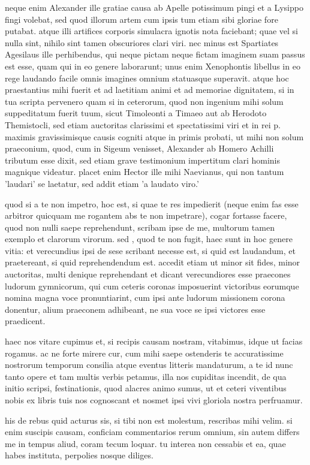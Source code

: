  neque enim Alexander ille gratiae causa ab Apelle potissimum pingi et a Lysippo fingi volebat, sed quod illorum artem cum ipsis tum etiam sibi gloriae fore putabat. atque illi artifices corporis simulacra ignotis nota faciebant; quae vel si nulla sint, nihilo sint tamen obscuriores clari viri. nec minus est Spartiates Agesilaus ille perhibendus, qui neque pictam neque fictam imaginem suam passus est esse, quam qui in eo genere laborarunt; unus enim Xenophontis libellus in eo rege laudando facile omnis imagines omnium statuasque superavit. atque hoc praestantius mihi fuerit et ad laetitiam animi et ad memoriae dignitatem, si in tua scripta pervenero quam si in ceterorum, quod non ingenium mihi solum suppeditatum fuerit tuum, sicut Timoleonti a Timaeo aut ab Herodoto Themistocli, sed etiam auctoritas clarissimi et spectatissimi viri et in rei p. maximis gravissimisque causis cogniti atque in primis probati, ut mihi non solum praeconium, quod, cum in Sigeum venisset, Alexander ab Homero Achilli tributum esse dixit, sed etiam grave testimonium impertitum clari hominis magnique videatur. placet enim Hector ille mihi Naevianus, qui non tantum 'laudari' se laetatur, sed addit etiam 'a laudato viro.'

 quod si a te non impetro, hoc est, si quae te res impedierit (neque enim fas esse arbitror quicquam me rogantem abs te non impetrare), cogar fortasse facere, quod non nulli saepe reprehendunt, scribam ipse de me, multorum tamen exemplo et clarorum virorum. sed , quod te non fugit, haec sunt in hoc genere vitia: et verecundius ipsi de sese scribant necesse est, si quid est laudandum, et praetereant, si quid reprehendendum est. accedit etiam ut minor sit fides, minor auctoritas, multi denique reprehendant et dicant verecundiores esse praecones ludorum gymnicorum, qui cum ceteris coronas imposuerint victoribus eorumque nomina magna voce pronuntiarint, cum ipsi ante ludorum missionem corona donentur, alium praeconem adhibeant, ne sua voce se ipsi victores esse praedicent.

 haec nos vitare cupimus et, si recipis causam nostram, vitabimus, idque ut facias rogamus. ac ne forte mirere cur, cum mihi saepe ostenderis te accuratissime nostrorum temporum consilia atque eventus litteris mandaturum, a te id nunc tanto opere et tam multis verbis petamus, illa nos cupiditas incendit, de qua initio scripsi, festinationis, quod alacres animo sumus, ut et ceteri viventibus nobis ex libris tuis nos cognoscant et nosmet ipsi vivi gloriola nostra perfruamur.

 his de rebus quid acturus sis, si tibi non est molestum, rescribas mihi velim. si enim suscipis causam, conficiam commentarios rerum omnium, sin autem differs me in tempus aliud, coram tecum loquar. tu interea non cessabis et ea, quae habes instituta, perpolies nosque diliges.
